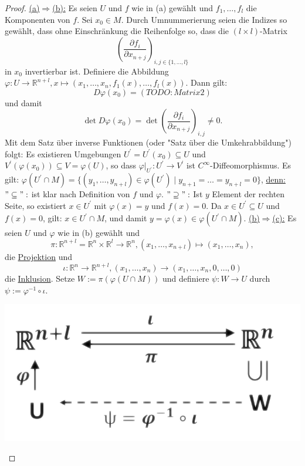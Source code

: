 \documentclass[a4paper,11pt,notitlepage]{report}
\theoremstyle{definition}
\newcommand{\R}{{\ensuremath{\mathbb{R}}}}
\begin{document}
\begin{proof}
		\underline{(a)$\Rightarrow$(b):} Es seien $U$ und $f$ wie in (a) gewählt und $f_1, \ldots, f_l$ die Komponenten von $f$. Sei $x_0 \in M$. Durch Umnummerierung seien die Indizes so gewählt, dass ohne Einschränkung die Reihenfolge so, dass die $(l \times l)$-Matrix 
		$$\left(\frac{\partial f_i}{\partial x_{n+j}}\right)_{i,j \in \{1, \ldots, l\}}$$
		in $x_0$ invertierbar ist.
		Definiere die Abbildung $\varphi \colon U \rightarrow \R^{n+l}, x \mapsto (x_1, \ldots, x_n, f_1(x), \ldots, f_l(x))$.
		Dann gilt:
		$$D \varphi(x_0)= (TODO:Matrix 2)$$ und damit 
		$$\det{D \varphi(x_0)} = \det{\left(\frac{\partial f_i}{\partial x_{n+j}}\right)_{i,j}} \neq 0.$$
		Mit dem Satz über inverse Funktionen (oder "Satz über die Umkehrabbildung") folgt:
		Es existieren Umgebungen $U^\prime = U^\prime(x_0) \subseteq U$ und $V^\prime(\varphi(x_0)) \subseteq V = \varphi(U)$, so dass
		$\varphi \big |_{U^\prime} \colon U^\prime \rightarrow V^\prime$ ist $C^\infty$-Diffeomorphismus.
		\newline
		Es gilt: $\varphi(U^\prime \cap M) = \{(y_1, \ldots, y_{n+l}) \in \varphi(U^\prime) \mid y_{n+1} = \ldots = y_{n+l}=0\}$,
		\underline{denn:} \newline $"\subseteq":$ ist klar nach Definition von $f$ und $\varphi$.
		\newline
		$"\supseteq":$ Ist $y$ Element der rechten Seite, so existiert $x \in U^\prime$ mit $\varphi(x)=y$ und $f(x)=0$. Da $x \in U^\prime \subseteq U$ und $f(x)=0$, gilt: $x \in U^\prime \cap M$, und damit $y = \varphi(x) \in \varphi(U^\prime \cap M)$.
		\newline
		 \underline{(b)$\Rightarrow$(c):} Es seien $U$ und $\varphi$ wie in (b) gewählt und
		 $$\pi \colon \R^{n+l} = \R^n \times \R^l \rightarrow \R^n, (x_1, \ldots, x_{n+l}) \mapsto (x_1, \ldots, x_n),$$
		 die \underline{Projektion} und
		 $$\iota \colon \R^n \rightarrow \R^{n+l}, (x_1, \ldots, x_n) \rightarrow (x_1, \ldots, x_n, 0, \ldots, 0)$$ die \underline{Inklusion}.
		 \newline
		 Setze $W := \pi(\varphi(U \cap M))$ und definiere $\psi \colon W \rightarrow U$ durch $\psi := \varphi^{-1} \circ \iota$.
\begin{center}
	\includegraphics[scale=0.5]{images/Beweis_Satz_UMF_Diagramm.png}

\end{center}
\end{proof}
\end{document}
